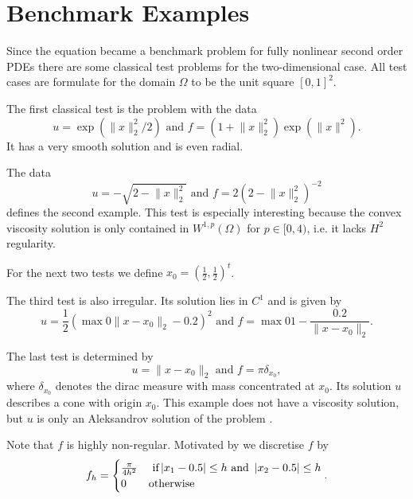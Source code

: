 \section{Benchmark Examples}

Since the \MA equation became a benchmark problem for fully nonlinear second order PDEs there are some classical test problems for the two-dimensional case. All test cases are formulate for the domain $\Omega$ to be the unit square $[0,1]^2$.

\begin{test} \label{test smooth}
The first classical \MA test is the problem with the data
\[
	u=\exp( \lVert x \rVert_2^2  /2) 
	\text { and } 
	f = (1 + \lVert x \rVert_2^2) \exp( \lVert x \rVert^2).
\]
It has a very smooth solution and is even radial.

\end{test}

\begin{test}\label{test sqrt}
The data
\[
	u = - \sqrt{ 2-  \lVert x \rVert_2^2}
	\text { and } 
	f = 2\left( 2-  \lVert x \rVert_2^2 \right)^{-2}
\]
defines the second example. This test is especially interesting because the convex viscosity solution is only contained in $W^{1,p}(\Omega) $ for $p \in [0,4)$\cite{DG2006a}, i.e. it lacks $H^2$ regularity.
\end{test}

For the next two tests we define $x_0 = \left(\frac 1 2, \frac 1 2  \right)^t$.

\begin{test}\label{test singularity}
The third \MA test is also irregular. Its solution lies in $C^1$ and is given by
\[
	u=\frac 1 2 \left( \max 0 {\lVert x - x_0 \rVert_2-0.2 }  \right)^2 
	\text { and } 
	f = \max 0 {1-\frac {0.2} {\lVert x - x_0 \rVert_2} }.
\]
\end{test}


\begin{test}\label{test dirac}
The last test is determined by
\[
	u = \lVert x - x_0 \rVert_2
	\text { and } 
	f = \pi \delta_{x_0},
\]
where $\delta_{x_0}$ denotes the dirac measure with mass concentrated at $x_0$. Its solution $u$ describes a cone with origin $x_0$. This example does not have a viscosity solution, but $u$ is only an Aleksandrov solution of the problem \cite[Section 2.3.]{FO2011}.

Note that $f$ is highly non-regular. Motivated by \cite[Section 6.1.]{FO2011} we discretise $f$ by
\begin{align*}
	f_h = \begin{cases}
		\frac \pi {4h^2} & \text{ if} \left| x_1 - 0.5 \right| \leq h \text{ and } \left| x_2 - 0.5 \right| \leq h \\
		0	& \text{otherwise}
	\end{cases}.
\end{align*}
\end{test}


